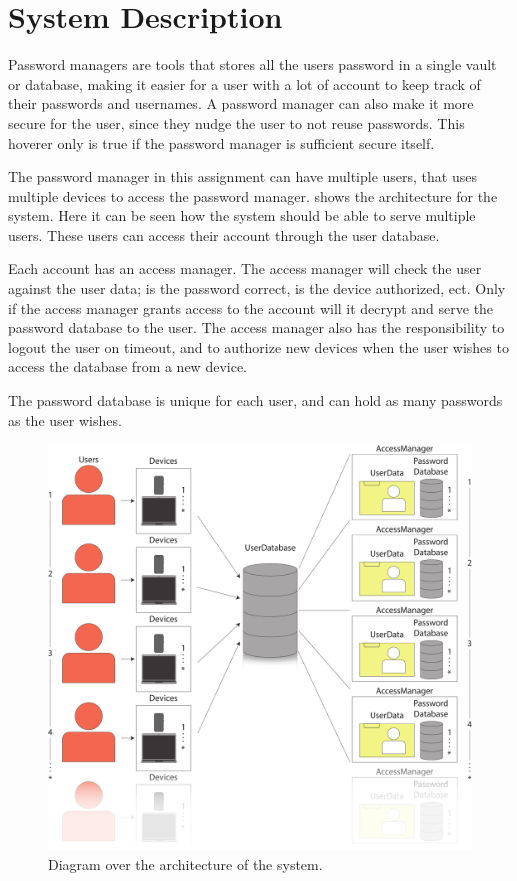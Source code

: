 \chapter{System Description}

Password managers are tools that stores all the users password in a single
vault or database, making it easier for a user with a lot of account to keep
track of their passwords and usernames. A password manager can also make it
more secure for the user, since they nudge the user to not reuse passwords.
This hoverer only is true if the password manager is sufficient secure itself.

The password manager in this assignment can have multiple users, that uses
multiple devices to access the password manager.  shows the
architecture for the system. Here it can be seen how the system should be able
to serve multiple users. These users can access their account through the user
database.

Each account has an access manager. The access manager will check the user
against the user data; is the password correct, is the device authorized, ect.
Only if the access manager grants access to the account will it decrypt and
serve the password database to the user. The access manager also has the
responsibility to logout the user on timeout, and to authorize new devices when
the user wishes to access the database from a new device.

The password database is unique for each user, and can hold as many passwords
as the user wishes.

\begin{figure}[H]
    \centering
    \includegraphics[width=\textwidth]{prj/figs/Architecture.pdf}
    \caption{Diagram over the architecture of the system.}
    \label{fig:sys:arch}
\end{figure}